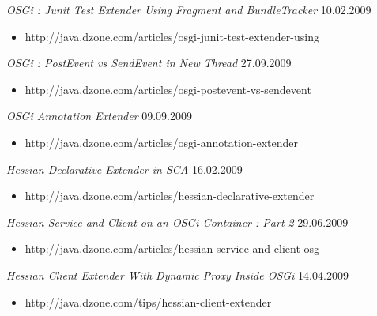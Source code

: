 \documentclass{res}
\begin{document}
\begin{resume}
{{\sl OSGi : Junit Test Extender Using Fragment and BundleTracker}  \hfill  10.02.2009	\\
\vspace{-5mm}  \begin{itemize}
\item[]  \scriptsize http://java.dzone.com/articles/osgi-junit-test-extender-using
\end{itemize}
\vspace{-2mm}

{\sl OSGi : PostEvent vs SendEvent in New Thread}  \hfill   27.09.2009	\\
\vspace{-5mm}  \begin{itemize}
\item[]  \scriptsize http://java.dzone.com/articles/osgi-postevent-vs-sendevent
\end{itemize}
\vspace{-2mm}

{\sl OSGi Annotation Extender}  \hfill    09.09.2009	\\
\vspace{-5mm}  \begin{itemize}
\item[]  \scriptsize http://java.dzone.com/articles/osgi-annotation-extender
\end{itemize}
\vspace{-2mm}

{\sl Hessian Declarative Extender in SCA}  \hfill   16.02.2009\\
\vspace{-5mm}  \begin{itemize}
\item[]  \scriptsize http://java.dzone.com/articles/hessian-declarative-extender
\end{itemize}
\vspace{-2mm}

{\sl Hessian Service and Client on an OSGi Container : Part 2}  \hfill   29.06.2009	\\
\vspace{-5mm}  \begin{itemize}
\item[]  \scriptsize http://java.dzone.com/articles/hessian-service-and-client-osg
\end{itemize}
\vspace{-2mm}

{\sl Hessian Client Extender With Dynamic Proxy Inside OSGi}  \hfill   14.04.2009	\\
\vspace{-5mm}  \begin{itemize}
\item[]  \scriptsize http://java.dzone.com/tips/hessian-client-extender
\end{itemize}
\vspace{-2mm}

}
\end{resume}
\end{document}
